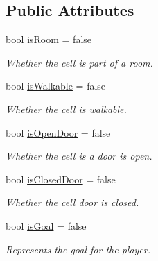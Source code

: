 \subsection*{Public Attributes}
\begin{DoxyCompactItemize}
\item 
\mbox{\label{class_cell_ae044a0c1ef1dd0ca08ffe22c4b763433}} 
bool \hyperlink{class_cell_ae044a0c1ef1dd0ca08ffe22c4b763433}{is\+Room} = false
\begin{DoxyCompactList}\small\item\em Whether the cell is part of a room. \end{DoxyCompactList}\item 
\mbox{\label{class_cell_a69d99aeda5f9117695c42ed209b7cf60}} 
bool \hyperlink{class_cell_a69d99aeda5f9117695c42ed209b7cf60}{is\+Walkable} = false
\begin{DoxyCompactList}\small\item\em Whether the cell is walkable. \end{DoxyCompactList}\item 
\mbox{\label{class_cell_a6d40064791a7160a9bb85a2e47a8dff4}} 
bool \hyperlink{class_cell_a6d40064791a7160a9bb85a2e47a8dff4}{is\+Open\+Door} = false
\begin{DoxyCompactList}\small\item\em Whether the cell is a door is open. \end{DoxyCompactList}\item 
\mbox{\label{class_cell_aedef9250bc88ff0c02b6fd43be0d3a64}} 
bool \hyperlink{class_cell_aedef9250bc88ff0c02b6fd43be0d3a64}{is\+Closed\+Door} = false
\begin{DoxyCompactList}\small\item\em Whether the cell door is closed. \end{DoxyCompactList}\item 
\mbox{\label{class_cell_add0d783175466a8c4122d51262496306}} 
bool \hyperlink{class_cell_add0d783175466a8c4122d51262496306}{is\+Goal} = false
\begin{DoxyCompactList}\small\item\em Represents the goal for the player. \end{DoxyCompactList}\item 

\end{DoxyCompactItemize}
